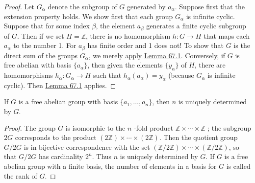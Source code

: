 \begin{proof}
Let \(G_{\alpha }\) denote the subgroup of \(G\) generated by \(a_{\alpha }\). Suppose first that the extension property holds. We show first that each group \(G_{\alpha }\) is infinite cyclic. Suppose that for some index \(\beta\), the element \(a_{\beta }\) generates a finite cyclic subgroup of \(G\). Then if we set \(H = \mathbb{Z}\), there is no homomorphism \(h : G \rightarrow H\) that maps each \(a_{\alpha }\) to the number 1. For \(a_{\beta }\) has finite order and 1 does not! To show that \(G\) is the direct sum of the groups \(G_{\alpha }\), we merely apply \hyperref[lem:67.1]{Lemma 67.1}.
Conversely, if \(G\) is free abelian with basis \(\{ a_{\alpha }\}\), then given the elements \(\{ y_{\alpha }\}\) of \(H\), there are homomorphisms \(h_{\alpha } : G_{\alpha } \rightarrow H\) such that \(h_{\alpha }( a_{\alpha }) = y_{\alpha }\) (because \(G_{\alpha }\) is infinite cyclic). Then \hyperref[lem:67.1]{Lemma 67.1} applies.
\end{proof}
\begin{theorem}
\label{thm:\thetheorem}
If \(G\) is a free abelian group with basis \(\{ {a_{1},\ldots ,a_{n}}\}\), then \(n\) is uniquely determined by \(G\).
\end{theorem}

\begin{proof}
The group \(G\) is isomorphic to the \(n\) -fold product \(\mathbb{Z} \times \cdots \times \mathbb{Z}\) ; the subgroup \({2G}\) corresponds to the product \(( {2\mathbb{Z}}) \times \cdots \times ( {2\mathbb{Z}})\). Then the quotient group \(G/{2G}\) is in bijective correspondence with the set \(( {\mathbb{Z}/2\mathbb{Z}}) \times \cdots \times ( {\mathbb{Z}/2\mathbb{Z}})\), so that \(G/{2G}\) has cardinality \(2^{n}\). Thus \(n\) is uniquely determined by \(G\).
If \(G\) is a free abelian group with a finite basis, the number of elements in a basis for \(G\) is called the rank of \(G\).
\end{proof}
